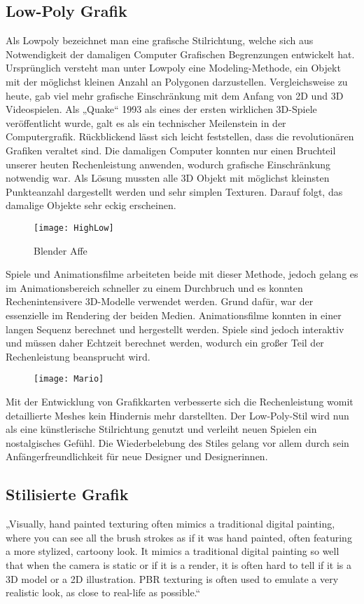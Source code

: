 \subsection{Low-Poly Grafik}

Als Lowpoly bezeichnet man eine grafische Stilrichtung, welche sich aus Notwendigkeit der damaligen Computer Grafischen Begrenzungen entwickelt hat. Ursprünglich versteht man unter Lowpoly eine Modeling-Methode, ein Objekt mit der möglichst kleinen Anzahl an Polygonen darzustellen. Vergleichsweise zu heute, gab viel mehr grafische Einschränkung mit dem Anfang von 2D und 3D Videospielen. Als „Quake“ 1993 als eines der ersten wirklichen 3D-Spiele veröffentlicht wurde, galt es als ein technischer Meilenstein in der Computergrafik. Rückblickend lässt sich leicht feststellen, dass die revolutionären Grafiken veraltet sind. Die damaligen Computer konnten nur einen Bruchteil unserer heuten Rechenleistung anwenden, wodurch grafische Einschränkung notwendig war. Als Lösung mussten alle 3D Objekt mit möglichst kleinsten Punkteanzahl dargestellt werden und sehr simplen Texturen. Darauf folgt, das damalige Objekte sehr eckig erscheinen.


\begin{figure}[h]
	\centerfirst
	\texttt{[image: HighLow]}
	\caption{Blender Affe}
\end{figure}


Spiele und Animationsfilme arbeiteten beide mit dieser Methode, jedoch gelang es im Animationsbereich schneller zu einem Durchbruch und es konnten Rechenintensivere 3D-Modelle verwendet werden. Grund dafür, war der essenzielle im Rendering der beiden Medien. Animationsfilme konnten in einer langen Sequenz berechnet und hergestellt werden. Spiele sind jedoch interaktiv und müssen daher Echtzeit berechnet werden, wodurch ein großer Teil der Rechenleistung beansprucht wird.

\begin{figure}[h]
	\centering
	\texttt{[image: Mario]}
	\caption{\cite{_mario}}
\end{figure}

Mit der Entwicklung von Grafikkarten verbesserte sich die Rechenleistung womit detaillierte Meshes kein Hindernis mehr darstellten. Der Low-Poly-Stil wird nun als eine künstlerische Stilrichtung genutzt und verleiht neuen Spielen ein nostalgisches Gefühl. Die Wiederbelebung des Stiles gelang vor allem durch sein Anfängerfreundlichkeit für neue Designer und Designerinnen. 

\subsection{Stilisierte Grafik}

„Visually, hand painted texturing often mimics a traditional digital painting, where you can see all the brush strokes as if it was hand painted, often featuring a more stylized, cartoony look. It mimics a traditional digital painting so well that when the camera is static or if it is a render, it is often hard to tell if it is a 3D model or a 2D illustration. PBR texturing is often used to emulate a very realistic look, as close to real-life as possible.“	\cite{_stylisedArt}



